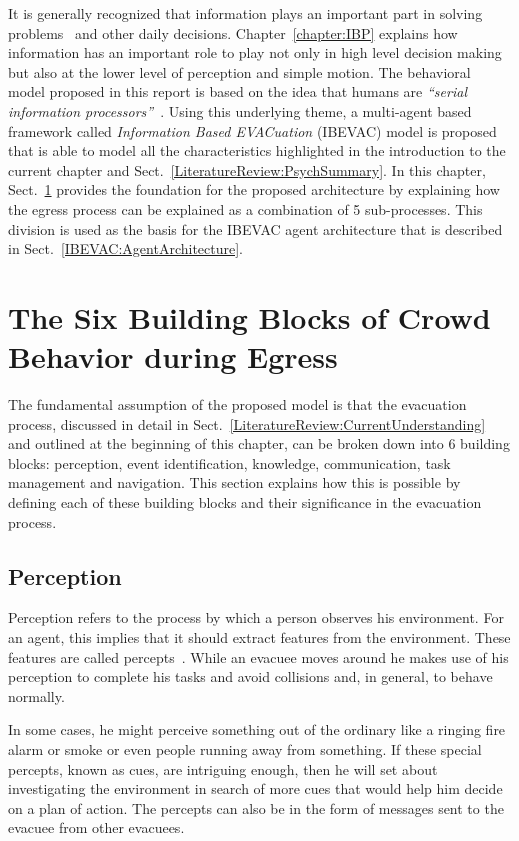It is generally recognized that information plays an important part in solving problems~\cite{Simon:1970th} and other daily decisions. Chapter~\ref{chapter:IBP} explains how information has an important role to play not only in high level decision making but also at the lower level of perception and simple motion. The behavioral model proposed in this report is based on the idea that humans are \emph{``serial information processors''}~\cite{Ozel:2001tn}. Using this underlying theme, a multi-agent based framework called \emph{Information Based EVACuation} (IBEVAC) model is proposed that is able to model all the characteristics highlighted in the introduction to the current chapter and Sect.~\ref{LiteratureReview:PsychSummary}. In this chapter, Sect.~\ref{IBEVAC:EgressProgress} provides the foundation for the proposed architecture by explaining how the egress process can be explained as a combination of 5 sub-processes. This division is used as the basis for the IBEVAC agent architecture that is described in Sect.~\ref{IBEVAC:AgentArchitecture}.

\section{The Six Building Blocks of Crowd Behavior during Egress}
\label{IBEVAC:EgressProgress}
The fundamental assumption of the proposed model is that the evacuation process, discussed in detail in Sect.~\ref{LiteratureReview:CurrentUnderstanding} and outlined at the beginning of this chapter, can be broken down into 6 building blocks: perception, event identification, knowledge, communication, task management and navigation. This section explains how this is possible by defining each of these building blocks and their significance in the evacuation process.

\subsection{Perception}
\label{IBEVAC:IBP}
	Perception refers to the process by which a person observes his environment. For an agent, this implies that it should extract features from the environment. These features are called percepts~\cite{Russel:1995vi}. While an evacuee moves around he makes use of his perception to complete his tasks and avoid collisions and, in general, to behave normally.

	In some cases, he might perceive something out of the ordinary like a ringing fire alarm or smoke or even people running away from something. If these special percepts, known as cues, are intriguing enough, then he will set about investigating the environment in search of more cues that would help him decide on a plan of action. The percepts can also be in the form of messages sent to the evacuee from other evacuees.

